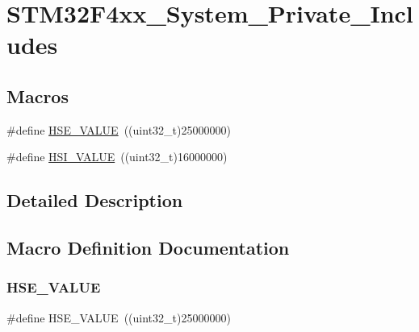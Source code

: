 \hypertarget{group___s_t_m32_f4xx___system___private___includes}{}\section{S\+T\+M32\+F4xx\+\_\+\+System\+\_\+\+Private\+\_\+\+Includes}
\label{group___s_t_m32_f4xx___system___private___includes}
\subsection*{Macros}
\begin{DoxyCompactItemize}
\item 
\#define \hyperlink{group___s_t_m32_f4xx___system___private___includes_gaeafcff4f57440c60e64812dddd13e7cb}{H\+S\+E\+\_\+\+V\+A\+L\+UE}~((uint32\+\_\+t)25000000)
\item 
\#define \hyperlink{group___s_t_m32_f4xx___system___private___includes_gaaa8c76e274d0f6dd2cefb5d0b17fbc37}{H\+S\+I\+\_\+\+V\+A\+L\+UE}~((uint32\+\_\+t)16000000)
\end{DoxyCompactItemize}


\subsection{Detailed Description}


\subsection{Macro Definition Documentation}
\mbox{\label{group___s_t_m32_f4xx___system___private___includes_gaeafcff4f57440c60e64812dddd13e7cb}} 
\subsubsection{\texorpdfstring{H\+S\+E\+\_\+\+V\+A\+L\+UE}{HSE\_VALUE}}
{\footnotesize\ttfamily \#define H\+S\+E\+\_\+\+V\+A\+L\+UE~((uint32\+\_\+t)25000000)}

